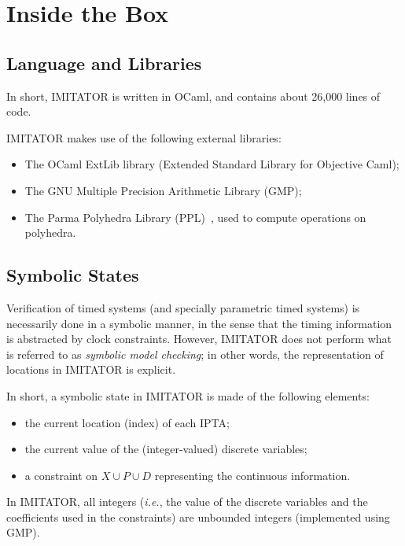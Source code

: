 \documentclass[a4paper,11pt]{report}
\newcommand{\Clock}{X} %
\newcommand{\DVar}{D} %
\newcommand{\Param}{P} %
\newcommand{\imitator}{\textsf{IMITATOR}}
\newcommand{\IPTA}{IPTA}
\newcommand{\ocaml}{OCaml}
\newcommand{\ie}{\textcolor{colorok}{\textit{i.e.}, }}
\begin{document}
\chapter{Inside the Box}


\section{Language and Libraries}

In short, \imitator{} is written in \ocaml{}, and contains about 26,000 lines of code.

\imitator{} makes use of the following external libraries:

\begin{itemize}
	\item The OCaml ExtLib library (Extended Standard Library for Objective Caml);
	\item The GNU Multiple Precision Arithmetic Library (GMP);
	\item The Parma Polyhedra Library (PPL)~\cite{bhz08}, used to compute operations on polyhedra.
\end{itemize}


\section{Symbolic States}

Verification of timed systems (and specially parametric timed systems) is necessarily done in a symbolic manner, in the sense that the timing information is abstracted by clock constraints.
However, \imitator{} does not perform what is referred to as \emph{symbolic model checking}; in other words, the representation of locations in \imitator{} is explicit.

In short, a symbolic state in \imitator{} is made of the following elements:
\begin{itemize}
	\item the current location (index) of each \IPTA{};
	\item the current value of the (integer-valued) discrete variables;
	\item a constraint on $\Clock \cup \Param \cup \DVar$ representing the continuous information.
\end{itemize}
In \imitator{}, all integers (\ie{} the value of the discrete variables and the coefficients used in the constraints) are unbounded integers (implemented using GMP).
\end{document}
